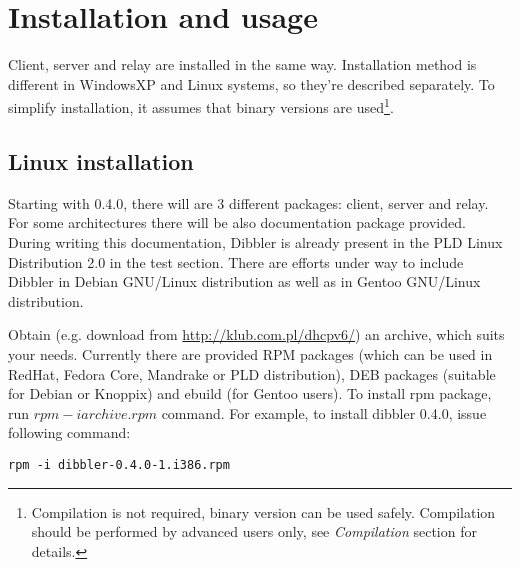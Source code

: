 
\section{Installation and usage}
Client, server and relay are installed in the same way. Installation
method is different in WindowsXP and Linux systems, so they're described
separately. To simplify installation, it assumes that binary versions
are used\footnote{Compilation is not required, binary version can be
  used safely. Compilation should be performed by
  advanced users only, see \emph{Compilation} section for details.}.

\subsection{Linux installation}
Starting with 0.4.0, there will are 3 different packages: client,
server and relay. For some architectures there will be also
documentation package provided. During writing this documentation,
Dibbler is already present in the PLD Linux Distribution 2.0 in the
test section. There are efforts under way to include 
Dibbler in Debian GNU/Linux distribution as well as in Gentoo
GNU/Linux distribution.

Obtain (e.g. download from \url{http://klub.com.pl/dhcpv6/}) an
archive, which suits your needs. Currently there are provided RPM packages
(which can be used in RedHat, Fedora Core, Mandrake or PLD
distribution), DEB packages (suitable for Debian or Knoppix) and
ebuild (for Gentoo users). To install rpm package, run $rpm -i
archive.rpm$ command. For example, to install dibbler 0.4.0, issue following command:
\begin{verbatim}
rpm -i dibbler-0.4.0-1.i386.rpm 
\end{verbatim}

